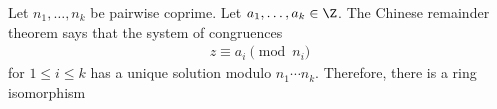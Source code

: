 \documentclass [preview, border = 20pt] {standalone}
\begin{document}
\pagecolor{black}
\color{white}
Let $n_1,\hdots,n_k$ be pairwise coprime. Let $a_1,\hdots, a_k\in \Z$. The Chinese remainder theorem says that the system of congruences
\begin{align*}
z \equiv a_i \pmod {n_i}
\end{align*}
for $1\le i \le k$ has a unique solution modulo $n_1\cdots n_k$. Therefore, there is a ring isomorphism
\begin{center}
\end{center} 
\end{document}
